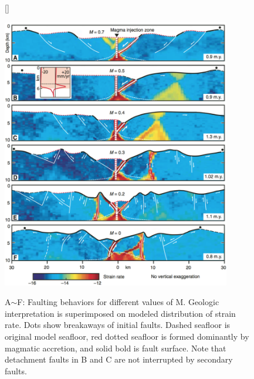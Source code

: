 \begin{figure}[H]
[\FBwidth]
{\caption{\small A$\sim$F: Faulting behaviors for different values of M. Geologic interpretation is superimposed on modeled distribution of strain rate. Dots show breakaways of initial faults. Dashed seafloor is original model seafloor, red dotted seafloor is formed dominantly by magmatic accretion, and solid bold is fault surface. Note that detachment faults in B and C are not interrupted by secondary faults. \citep{Tucholke2008}}}
 {\includegraphics[width=10cm]{./Figures/fig_Intro6_1.png}} 
 \label{fig_Intro6_1}
\end{figure}

